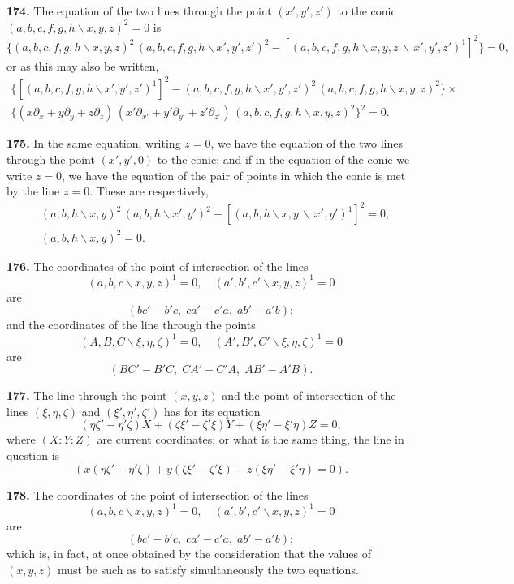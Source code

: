 \documentclass[11pt,a4paper]{article}
\begin{document}
\textbf{174.} The equation of the two lines through the point $(x',y',z')$ to the conic
$(a,b,c,f,g,h\!\backslash x,y,z)^2=0$ is
\[
\{(a,b,c,f,g,h\!\backslash x,y,z)^2\,(a,b,c,f,g,h\!\backslash x',y',z')^2 - [(a,b,c,f,g,h\!\backslash x,y,z\,\backslash\,x',y',z')^1]^2\}=0,
\]
or as this may also be written,
\begin{multline*}
\{[(a,b,c,f,g,h\!\backslash x',y',z')^1]^2 - (a,b,c,f,g,h\!\backslash x',y',z')^2\,(a,b,c,f,g,h\!\backslash x,y,z)^2\}\times\\
\{(x\partial_x+y\partial_y+z\partial_z)\,(x'\partial_{x'}+y'\partial_{y'}+z'\partial_{z'})\,(a,b,c,f,g,h\!\backslash x,y,z)^2\}^2 = 0.
\end{multline*}

\textbf{175.} In the same equation, writing $z=0$, we have the equation of the two
lines through the point $(x',y',0)$ to the conic; and if in the equation of the conic
we write $z=0$, we have the equation of the pair of points in which the conic is
met by the line $z=0$. These are respectively,
\begin{align*}
&(a,b,h\!\backslash x,y)^2\,(a,b,h\!\backslash x',y')^2 - [(a,b,h\!\backslash x,y\,\backslash\,x',y')^1]^2 = 0,\\
&(a,b,h\!\backslash x,y)^2 = 0.
\end{align*}

\textbf{176.} The coordinates of the point of intersection of the lines
\[
(a,b,c\!\backslash x,y,z)^1=0,\quad (a',b',c'\!\backslash x,y,z)^1=0
\]
are
\[
(bc'-b'c,\; ca'-c'a,\; ab'-a'b);
\]
and the coordinates of the line through the points
\[
(A,B,C\!\backslash \xi,\eta,\zeta)^1=0,\quad (A',B',C'\!\backslash \xi,\eta,\zeta)^1=0
\]
are
\[
(BC'-B'C,\; CA'-C'A,\; AB'-A'B).
\]

\textbf{177.} The line through the point $(x,y,z)$ and the point of intersection of the
lines $(\xi,\eta,\zeta)$ and $(\xi',\eta',\zeta')$ has for its equation
\[
(\eta\zeta'-\eta'\zeta)X + (\zeta\xi'-\zeta'\xi)Y + (\xi\eta'-\xi'\eta)Z = 0,
\]
where $(X:Y:Z)$ are current coordinates; or what is the same thing, the line in
question is
\[
(x(\eta\zeta'-\eta'\zeta) + y(\zeta\xi'-\zeta'\xi) + z(\xi\eta'-\xi'\eta) = 0).
\]

\textbf{178.} The coordinates of the point of intersection of the lines
\[
(a,b,c\!\backslash x,y,z)^1=0,\quad (a',b',c'\!\backslash x,y,z)^1=0
\]
are
\[
(bc'-b'c,\; ca'-c'a,\; ab'-a'b);
\]
which is, in fact, at once obtained by the consideration that the values of $(x,y,z)$
must be such as to satisfy simultaneously the two equations.
\end{document}
